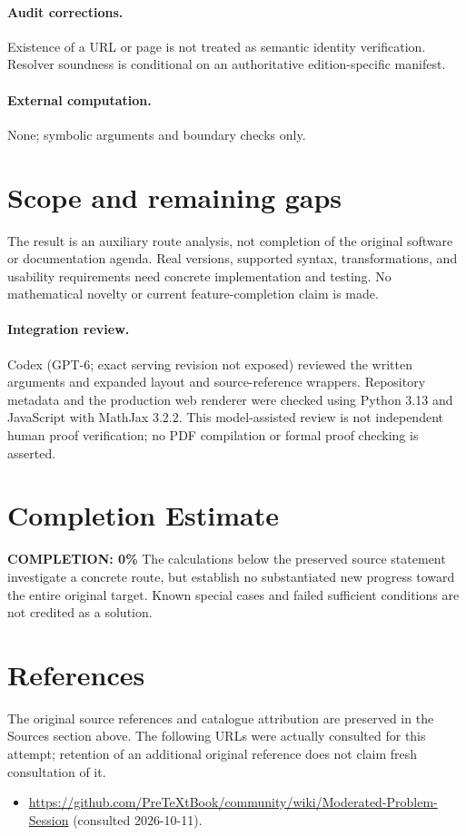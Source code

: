 \documentclass[11pt]{article}
\begin{document}
\paragraph{Audit corrections.} Existence of a URL or page is not treated as semantic identity verification. Resolver soundness is conditional on an authoritative edition-specific manifest.
\paragraph{External computation.} None; symbolic arguments and boundary checks only.
\section{Scope and remaining gaps}
The result is an auxiliary route analysis, not completion of the original software or documentation agenda. Real versions, supported syntax, transformations, and usability requirements need concrete implementation and testing. No mathematical novelty or current feature-completion claim is made.
\paragraph{Integration review.} Codex (GPT-6; exact serving revision not exposed) reviewed the written arguments and expanded layout and source-reference wrappers. Repository metadata and the production web renderer were checked using Python 3.13 and JavaScript with MathJax 3.2.2. This model-assisted review is not independent human proof verification; no PDF compilation or formal proof checking is asserted.

\section{Completion Estimate}
\noindent\textbf{COMPLETION: 0\%}
The calculations below the preserved source statement investigate a concrete route,
but establish no substantiated new progress toward the entire original target.
Known special cases and failed sufficient conditions are not credited as a solution.
\section{References}
The original source references and catalogue attribution are preserved in the
Sources section above. The following URLs were actually consulted for this attempt;
retention of an additional original reference does not claim fresh consultation of it.
\begin{itemize}
\item \url{https://github.com/PreTeXtBook/community/wiki/Moderated-Problem-Session} (consulted 2026-10-11). 
\end{itemize}
\end{document}
